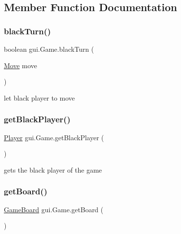 \subsection{Member Function Documentation}
\mbox{\label{classgui_1_1_game_a9f59968c4a6041a7e18a2898122a0f73}} 
\subsubsection{\texorpdfstring{black\+Turn()}{blackTurn()}}
{\footnotesize\ttfamily boolean gui.\+Game.\+black\+Turn (\begin{DoxyParamCaption}\item[{\mbox{\hyperlink{classpieces_1_1_move}{Move}}}]{move }\end{DoxyParamCaption})}

let black player to move \mbox{\label{classgui_1_1_game_a4fa4bff17684c1f215f0925e6266aeb0}} 
\subsubsection{\texorpdfstring{get\+Black\+Player()}{getBlackPlayer()}}
{\footnotesize\ttfamily \mbox{\hyperlink{classplayers_1_1_player}{Player}} gui.\+Game.\+get\+Black\+Player (\begin{DoxyParamCaption}{ }\end{DoxyParamCaption})}

gets the black player of the game \mbox{\label{classgui_1_1_game_afdc30ea2b00b6b06e255d3420d5c9e67}} 
\subsubsection{\texorpdfstring{get\+Board()}{getBoard()}}
{\footnotesize\ttfamily \mbox{\hyperlink{classgameboard_1_1_game_board}{Game\+Board}} gui.\+Game.\+get\+Board (\begin{DoxyParamCaption}{ }\end{DoxyParamCaption})}


